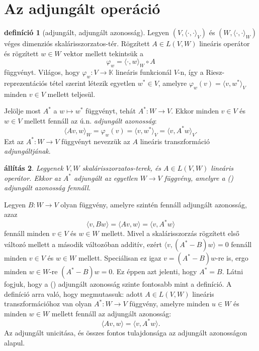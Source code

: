 \documentclass[9pt, a4paper, showtrims]{memoir}
\makeatletter
\renewenvironment{proof}[1][\proofname]
    {\par\pushQED{\qed}%
    \normalfont \topsep6\p@\@plus6\p@\relax
    \trivlist
    \item[\hskip\labelsep
        \itshape
    #1\@addpunct{:}]\ignorespaces}
    {\popQED\endtrivlist\@endpefalse}
\theoremstyle{plain}
\newtheorem{proposition}{állítás}[chapter]
\theoremstyle{remark}
\theoremstyle{definition}
\newtheorem{definition}[proposition]{definíció}
\newcommand{\ip}[2]{\langle#1,#2\rangle}
\makeatother
\begin{document}
\section{Az adjungált operáció}
\begin{definition}[adjungált, adjungált azonosság]
	Legyen $\left( V,\ip{\cdot}{\cdot}_V \right)$ és
	$\left( W,\ip{\cdot}{\cdot}_W \right)$ véges dimenziós ska\-láris\-szor\-zatos-tér.
	Rögzített $A\in L\left( V,W \right)$ lineáris operátor és rögzített $w\in W$ vektor mellett tekintsük a
	\[
		\varphi_w=
		\ip{\cdot}{w}_W\circ A
	\]
	függvényt.
	Világos, hogy $\varphi_w:V\to\mathbb{K}$ lineáris funkcionál $V$-n,
	így a Riesz-reprezentációs tétel szerint létezik egyetlen $w^\ast\in V$,
	amelyre
	$\varphi_w\left( v \right)=\ip{v}{w^\ast}_V$ minden $v\in V$ mellett teljesül.

	Jelölje most $A^\ast$ a $w\mapsto w^\ast$ függvényt, tehát
	$A^\ast:W\to V$.
	Ekkor minden $v\in V$ és $w\in V$ mellett fennáll az ú.n. \emph{adjungált azonosság}:
	\[
		\ip{Av}{w}_W
		=
		\varphi_w\left( v \right)
		=
		\ip{v}{w^\ast}_V
		=
		\ip{v}{A^\ast w}_V.\tag{\dag}
	\]
	Ezt az $A^\ast:W\to V$ függvényt nevezzük az $A$ lineáris transzformáció \emph{adjungáltjának}.
\end{definition}
\begin{proposition}
	Legyenek $V,W$ skalárisszorzatos-terek, és $A\in L\left( V,W \right)$ lineáris operátor.
	Ekkor az $A^\ast$ adjungált az egyetlen $W\to V$ függvény,
	amelyre a (\dag) adjungált azonosság fennáll.
\end{proposition}
\begin{proof}
	Legyen $B:W\to V$ olyan függvény, amelyre szintén fennáll adjungált azonosság,
	azaz
	\[
		\ip{v}{Bw}
		=
		\ip{Av}{w}
		=
		\ip{v}{A^\ast w}
	\]
	fennáll minden $v\in V$ és $w\in W$ mellett.
	Mivel a skalárisszorzás rögzített első változó mellett a második változóban additív,
	ezért
	$\ip{v}{\left( A^\ast-B \right)w}=0$ fennáll minden $v\in V$ és $w\in W$ mellett.
	Speciálisan ez igaz $v=\left( A^\ast-B \right)w$-re is, ergo minden $w\in W$-re
	$\left( A^\ast-B \right)w=0$.
	Ez éppen azt jelenti, hogy $A^\ast=B$.
\end{proof}
Látni fogjuk, hogy a (\dag) adjungált azonosság szinte fontosabb mint a definíció.
A definíció arra való, hogy megmutassuk: adott $A\in L\left( V,W \right)$ lineáris transzformációhoz van olyan
$A^\ast:W\to V$ függvény, amelyre minden $u\in W$ és minden $w\in W$ mellett fennáll az adjungált azonosság:
\[
	\ip{Av}{w}
	=
	\ip{v}{A^\ast w}.
	\tag{\dag}
\]
Az adjungált unicitása, és összes fontos tulajdonsága az adjungált azonosságon alapul.
\end{document}
